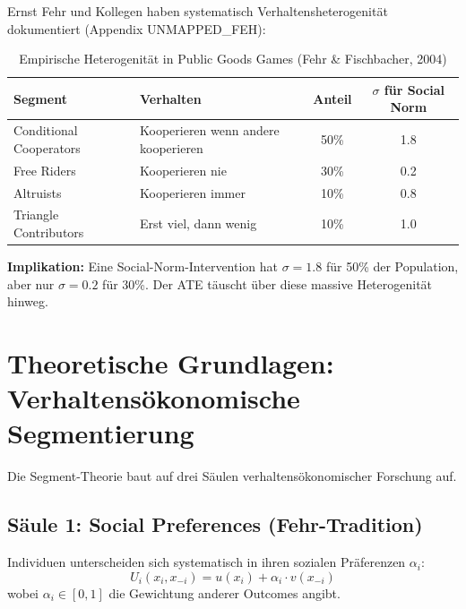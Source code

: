 Ernst Fehr und Kollegen haben systematisch Verhaltensheterogenität dokumentiert (Appendix UNMAPPED_FEH):

\begin{table}[htbp]
\centering
\caption{Empirische Heterogenität in Public Goods Games (Fehr \& Fischbacher, 2004)}
\label{tab:19-fehr-heterogeneity}
\renewcommand{\arraystretch}{1.3}
\small
\begin{tabular}{@{}llcc@{}}
\toprule
\textbf{Segment} & \textbf{Verhalten} & \textbf{Anteil} & \textbf{$\sigma$ für Social Norm} \\
\midrule
Conditional Cooperators & Kooperieren wenn andere kooperieren & 50\% & 1.8 \\
Free Riders & Kooperieren nie & 30\% & 0.2 \\
Altruists & Kooperieren immer & 10\% & 0.8 \\
Triangle Contributors & Erst viel, dann wenig & 10\% & 1.0 \\
\bottomrule
\end{tabular}
\end{table}

\textbf{Implikation:} Eine Social-Norm-Intervention hat $\sigma = 1.8$ für 50\% der Population, aber nur $\sigma = 0.2$ für 30\%. Der ATE täuscht über diese massive Heterogenität hinweg.


\section{Theoretische Grundlagen: Verhaltensökonomische Segmentierung}
\label{sec:19-theory}

Die Segment-Theorie baut auf drei Säulen verhaltensökonomischer Forschung auf.

\subsection{Säule 1: Social Preferences (Fehr-Tradition)}

\begin{tcolorbox}[colback=blue!5!white, colframe=blue!75!black,
    title=Axiom PAP1-1: Social Preference Heterogeneity]
Individuen unterscheiden sich systematisch in ihren sozialen Präferenzen $\alpha_i$:
\begin{equation}
U_i(x_i, x_{-i}) = u(x_i) + \alpha_i \cdot v(x_{-i})
\label{eq:19-social-utility}
\end{equation}
wobei $\alpha_i \in [0, 1]$ die Gewichtung anderer Outcomes angibt.
\end{tcolorbox}

